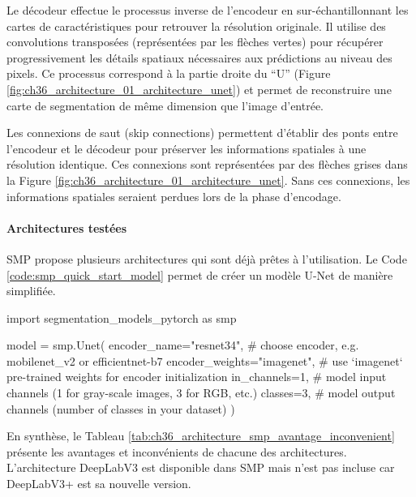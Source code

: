 Le décodeur effectue le processus inverse de l'encodeur en sur-échantillonnant les cartes de caractéristiques pour retrouver la résolution originale. Il utilise des convolutions transposées (représentées par les flèches vertes) pour récupérer progressivement les détails spatiaux nécessaires aux prédictions au niveau des pixels. Ce processus correspond à la partie droite du ``U'' (Figure \ref{fig:ch36_architecture_01_architecture_unet}) et permet de reconstruire une carte de segmentation de même dimension que l'image d'entrée.

Les connexions de saut (skip connections) permettent d'établir des ponts entre l'encodeur et le décodeur pour préserver les informations spatiales à une résolution identique. Ces connexions sont représentées par des flèches grises dans la Figure \ref{fig:ch36_architecture_01_architecture_unet}. Sans ces connexions, les informations spatiales seraient perdues lors de la phase d'encodage.

\paragraph{Architectures testées}
SMP propose plusieurs architectures qui sont déjà prêtes à l'utilisation. Le Code \ref{code:smp_quick_start_model} permet de créer un modèle U-Net de manière simplifiée.

\begin{code}[H]
    \begin{pythoncode}
    import segmentation_models_pytorch as smp
    
    model = smp.Unet(
        encoder_name="resnet34",        # choose encoder, e.g. mobilenet_v2 or efficientnet-b7
        encoder_weights="imagenet",     # use `imagenet` pre-trained weights for encoder initialization
        in_channels=1,                  # model input channels (1 for gray-scale images, 3 for RGB, etc.)
        classes=3,                      # model output channels (number of classes in your dataset)
    )
    \end{pythoncode}
    \label{code:smp_quick_start_model}
\end{code}

En synthèse, le Tableau \ref{tab:ch36_architecture_smp_avantage_inconvenient} présente les avantages et inconvénients de chacune des architectures. L'architecture DeepLabV3 est disponible dans SMP mais n'est pas incluse car DeepLabV3+ est sa nouvelle version.

